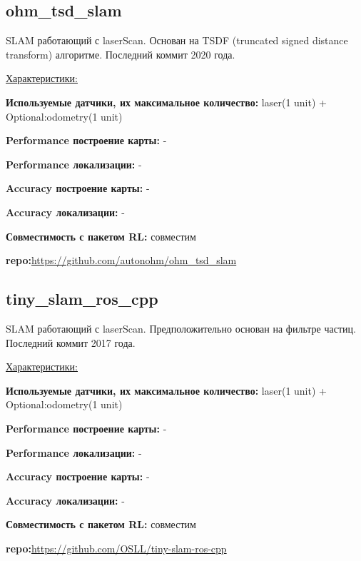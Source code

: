 \documentclass[a4paper, 14pt]{extreport}
\begin{document}
\subsection{ohm\_tsd\_slam}
\par SLAM работающий с laserScan. Основан на TSDF (truncated signed distance transform) алгоритме. Последний коммит 2020 года.
\vspace{2mm}
\par\noindent \underline{Характеристики:}
\par\textbf{Используемые датчики, их максимальное количество:} laser(1 unit) + Optional:odometry(1 unit)
\par\textbf{Performance построение карты:} -
\par\textbf{Performance локализации:} -
\par\textbf{Accuracy построение карты:} -
\par\textbf{Accuracy локализации:} -
\par\textbf{Совместимость с пакетом RL:} совместим
\par\textbf{repo:}\url{https://github.com/autonohm/ohm_tsd_slam}
\subsection{tiny\_slam\_ros\_cpp}
\par SLAM работающий с laserScan. Предположительно основан на фильтре частиц. Последний коммит 2017 года.
\vspace{2mm}
\par\noindent \underline{Характеристики:}
\par\textbf{Используемые датчики, их максимальное количество:} laser(1 unit) + Optional:odometry(1 unit)
\par\textbf{Performance построение карты:} -
\par\textbf{Performance локализации:} -
\par\textbf{Accuracy построение карты:} -
\par\textbf{Accuracy локализации:} -
\par\textbf{Совместимость с пакетом RL:} совместим
\par\textbf{repo:}\url{https://github.com/OSLL/tiny-slam-ros-cpp}
\end{document}
